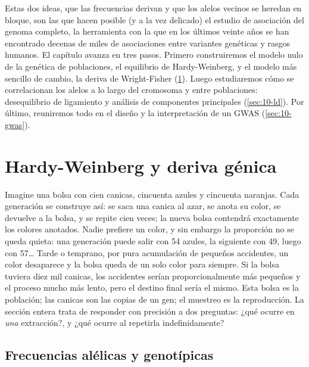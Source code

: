 Estas dos ideas, que las frecuencias derivan y que los alelos vecinos se heredan en bloque, son las que hacen posible (y a la vez delicado) el estudio de asociación del genoma completo, la herramienta con la que en los últimos veinte años se han encontrado decenas de miles de asociaciones entre variantes genéticas y rasgos humanos. El capítulo avanza en tres pasos. Primero construiremos el modelo nulo de la genética de poblaciones, el equilibrio de Hardy-Weinberg, y el modelo más sencillo de cambio, la deriva de Wright-Fisher (\cref{sec:10-hw}). Luego estudiaremos cómo se correlacionan los alelos a lo largo del cromosoma y entre poblaciones: desequilibrio de ligamiento y análisis de componentes principales (\cref{sec:10-ld}). Por último, reuniremos todo en el diseño y la interpretación de un GWAS (\cref{sec:10-gwas}).

\section{Hardy-Weinberg y deriva génica}\label{sec:10-hw}

\begin{intuicion}
Imagine una bolsa con cien canicas, cincuenta azules y cincuenta naranjas. Cada generación se construye así: se saca una canica al azar, se anota su color, se devuelve a la bolsa, y se repite cien veces; la nueva bolsa contendrá exactamente los colores anotados. Nadie prefiere un color, y sin embargo la proporción no se queda quieta: una generación puede salir con 54 azules, la siguiente con 49, luego con 57\dots{} Tarde o temprano, por pura acumulación de pequeños accidentes, un color desaparece y la bolsa queda de un solo color para siempre. Si la bolsa tuviera diez mil canicas, los accidentes serían proporcionalmente más pequeños y el proceso mucho más lento, pero el destino final sería el mismo. Esta bolsa es la población; las canicas son las copias de un gen; el muestreo es la reproducción. La sección entera trata de responder con precisión a dos preguntas: ¿qué ocurre en \emph{una} extracción?, y ¿qué ocurre al repetirla indefinidamente?
\end{intuicion}

\subsection{Frecuencias alélicas y genotípicas}

